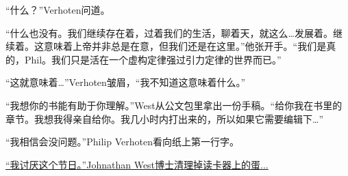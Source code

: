 “什么？”Verhoten问道。

“什么也没有。我们继续存在着，过着我们的生活，聊着天，就这么…发展着。继续着。这意味着上帝并非总是在意，但我们还是在这里。”他张开手。“我们是真的，Phil。我们只是活在一个虚构定律强过引力定律的世界而已。”

“这就意味着…”Verhoten皱眉，“我不知道这意味着什么。”

“我想你的书能有助于你理解。”West从公文包里拿出一份手稿。“给你我在书里的章节。我想我得亲自给你。我几小时内打出来的，所以如果它需要编辑下…”

“我相信会没问题。”Philip Verhoten看向纸上第一行字。

\begin{scpbox}


\hyperref[chap:]{“我讨厌这个节日。”Johnathan West博士清理掉读卡器上的蛋...}

\end{scpbox}
